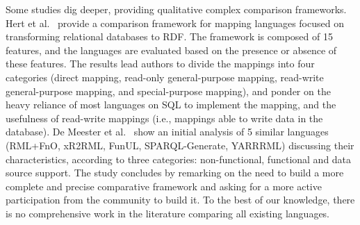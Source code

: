 Some studies dig deeper, providing qualitative complex comparison frameworks. Hert et al.~\cite{hert2011comparison} provide a comparison framework for mapping languages focused on transforming relational databases to RDF. The framework is composed of 15 features, and the languages are evaluated based on the presence or absence of these features.%
The results lead authors to divide the mappings into four categories (direct mapping, read-only general-purpose mapping, read-write general-purpose mapping, and special-purpose mapping), and ponder on the heavy reliance of most languages on SQL to implement the mapping, and the usefulness of read-write mappings (i.e., mappings able to write data in the database). De Meester et al.~\cite{DeMeester2019comparison} show an initial analysis of 5 similar languages (RML+FnO, xR2RML, FunUL, SPARQL-Generate, YARRRML) discussing their characteristics, according to three categories: non-functional, functional and data source support. The study concludes by remarking on the need to build a more complete and precise comparative framework and asking for a more active participation from the community to build it. To the best of our knowledge, there is no comprehensive work in the literature comparing all existing languages.  
